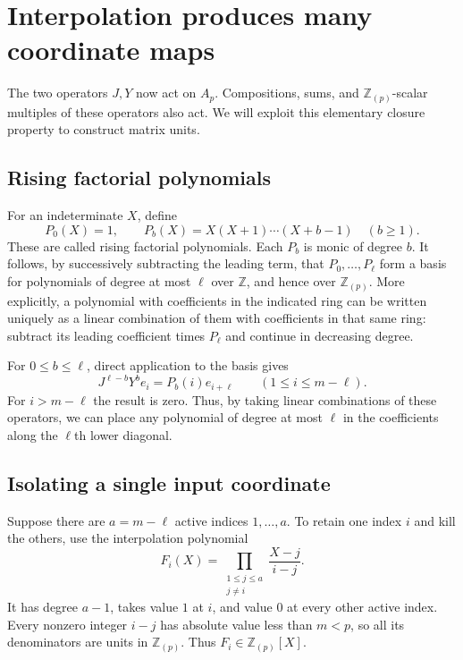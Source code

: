 \documentclass[11pt]{article}
\numberwithin{equation}{section}
\theoremstyle{definition}
\theoremstyle{remark}
\newcommand{\Z}{\mathbb Z}
\newcommand{\Rloc}{\mathbb Z_{(p)}}
\begin{document}
\section{Interpolation produces many coordinate maps}\label{sec:interpolation}
The two operators $J,Y$ now act on $A_p$. Compositions, sums, and $\Rloc$-scalar multiples of these operators also act. We will exploit this elementary closure property to construct matrix units.

\subsection{Rising factorial polynomials}
For an indeterminate $X$, define
\[
P_0(X)=1,\qquad P_b(X)=X(X+1)\cdots(X+b-1)\quad(b\ge1).
\]
These are called rising factorial polynomials. Each $P_b$ is monic of degree $b$. It follows, by successively subtracting the leading term, that $P_0,\ldots,P_\ell$ form a basis for polynomials of degree at most $\ell$ over $\Z$, and hence over $\Rloc$. More explicitly, a polynomial with coefficients in the indicated ring can be written uniquely as a linear combination of them with coefficients in that same ring: subtract its leading coefficient times $P_\ell$ and continue in decreasing degree.

For $0\le b\le\ell$, direct application to the basis gives
\begin{equation}\label{eq:risingoperators}
J^{\ell-b}Y^b e_i=P_b(i)e_{i+\ell}
\qquad(1\le i\le m-\ell).
\end{equation}
For $i>m-\ell$ the result is zero. Thus, by taking linear combinations of these operators, we can place any polynomial of degree at most $\ell$ in the coefficients along the $\ell$th lower diagonal.

\subsection{Isolating a single input coordinate}
Suppose there are $a=m-\ell$ active indices $1,\ldots,a$. To retain one index $i$ and kill the others, use the interpolation polynomial
\begin{equation}\label{eq:lagrange}
F_i(X)=\prod_{\substack{1\le j\le a\\j\ne i}}\frac{X-j}{i-j}.
\end{equation}
It has degree $a-1$, takes value $1$ at $i$, and value $0$ at every other active index. Every nonzero integer $i-j$ has absolute value less than $m<p$, so all its denominators are units in $\Rloc$. Thus $F_i\in\Rloc[X]$.
\end{document}
